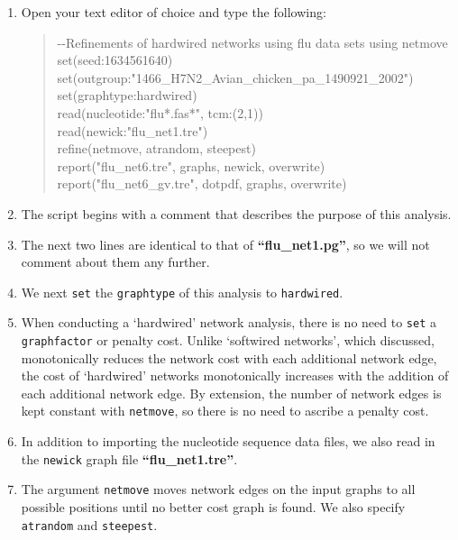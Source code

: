 \documentclass[11pt]{article}
\begin{document}
\begin {enumerate}

\item Open your text editor of choice and type the following:

	\begin{quote}	
	-\/-Refinements of hardwired networks using flu data sets using netmove\\
	set(seed:1634561640)\\
	set(outgroup:"1466\_H7N2\_Avian\_chicken\_pa\_1490921\_2002")\\
	set(graphtype:hardwired)\\
	read(nucleotide:"flu*.fas*", tcm:(2,1))\\
	read(newick:"flu\_net1.tre")\\
	refine(netmove, atrandom, steepest)\\
	report("flu\_net6.tre", graphs, newick, overwrite)\\
	report("flu\_net6\_gv.tre", dotpdf, graphs, overwrite)
	\end{quote}
	
\item The script begins with a comment that describes the purpose of this 
analysis.

\item The next two lines are identical to that of \textbf{``flu\_net1.pg''}, so we 
will not comment about them any further. 	

\item We next \texttt{set} the \texttt{graphtype} of this analysis to \texttt{hardwired}. 

\item When conducting a `hardwired' network analysis, there is no need to \texttt{set}
a \texttt{graphfactor} or penalty cost. Unlike `softwired networks', which discussed, 
monotonically reduces the network cost with each additional network edge, 
the cost of `hardwired' networks monotonically increases with the addition of each 
additional network edge. By extension, the number of network edges is kept constant
with \texttt{netmove}, so there is no need to ascribe a penalty cost.

\item In addition to importing the nucleotide sequence data files, we also read in 
the \texttt{newick} graph file \textbf{``flu\_net1.tre''}.

\item The argument \texttt{netmove} moves network edges on the input graphs 
to all possible positions until no better cost graph is found. We also specify 
\texttt{atrandom} and \texttt{steepest}.


\end{enumerate}
\end{document}
